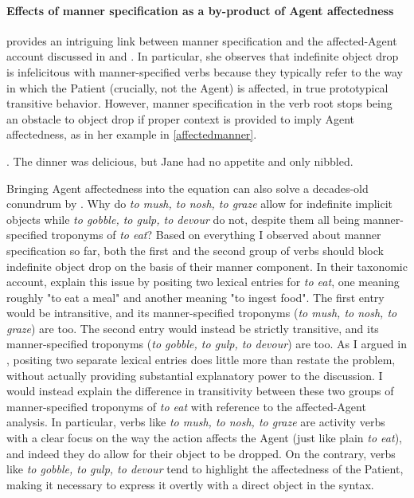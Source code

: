 \paragraph{Effects of manner specification as a by-product of Agent affectedness}
\textcite[139]{Naess2007} provides an intriguing link between manner specification and the affected-Agent account discussed in  and . In particular, she observes that indefinite object drop is infelicitous with manner-specified verbs because they typically refer to the way in which the Patient (crucially, not the Agent) is affected, in true prototypical transitive behavior. However, manner specification in the verb root stops being an obstacle to object drop if proper context is provided to imply Agent affectedness, as in her example in \ref{affectedmanner}.

\ex. \label{affectedmanner} The dinner was delicious, but Jane had no appetite and only nibbled.

Bringing Agent affectedness into the equation can also solve a decades-old conundrum by \textcite{FellbaumKegl1989taxonomic}. Why do \textit{to mush, to nosh, to graze} allow for indefinite implicit objects while \textit{to gobble, to gulp, to devour} do not, despite them all being manner-specified troponyms of \textit{to eat}? Based on everything I observed about manner specification so far, both the first and the second group of verbs should block indefinite object drop on the basis of their manner component. In their taxonomic account, \textcite{FellbaumKegl1989taxonomic} explain this issue by positing two lexical entries for \textit{to eat}, one meaning roughly "to eat a meal" and another meaning "to ingest food". The first entry would be intransitive, and its manner-specified troponyms (\textit{to mush, to nosh, to graze}) are too. The second entry would instead be strictly transitive, and its manner-specified troponyms (\textit{to gobble, to gulp, to devour}) are too. As I argued in , positing two separate lexical entries does little more than restate the problem, without actually providing substantial explanatory power to the discussion. I would instead explain the difference in transitivity between these two groups of manner-specified troponyms of \textit{to eat} with reference to the affected-Agent analysis. In particular, verbs like \textit{to mush, to nosh, to graze} are activity verbs with a clear focus on the way the action affects the Agent (just like plain \textit{to eat}), and indeed they do allow for their object to be dropped. On the contrary, verbs like \textit{to gobble, to gulp, to devour} tend to highlight the affectedness of the Patient, making it necessary to express it overtly with a direct object in the syntax.

